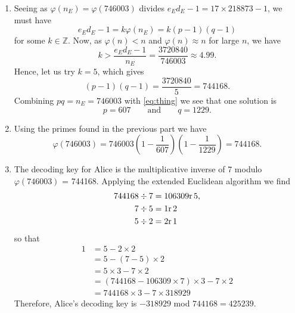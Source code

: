 \documentclass[a4paper]{article}
\begin{document}
\begin{enumerate}
\begin{enumerate}
			\item Seeing as $\varphi(n_E) = \varphi(746003)$ divides $e_E d_E - 1 = 17 \times 218873 - 1$, we must have
			\begin{equation*}
				e_E d_E - 1 = k \varphi(n_E) = k (p - 1) (q - 1)
			\end{equation*}
			for some $k \in \mathbb{Z}$. Now, as $\varphi(n) < n$ and $\varphi(n) \approx n$  for large $n$, we have
			\begin{equation*}
				k > \frac{e_E d_E - 1}{n_E} = \frac{3720840}{746003} \approx 4.99.
			\end{equation*}
			Hence, let us try $k = 5$, which gives
			\begin{equation}
				(p - 1) (q - 1) = \frac{3720840}{5} = 744168. \label{eq:thing}
			\end{equation}
			Combining $pq = n_E = 746003$ with \eqref{eq:thing} we see that one solution is
			\begin{equation*}
				p = 607 \qquad \text{and} \qquad q = 1229.
			\end{equation*}
			
			\item Using the primes found in the previous part we have
			\begin{equation*}
				\varphi(746003) = 746003 \left( 1 - \frac{1}{607} \right) \left( 1 - \frac{1}{1229} \right) = 744168.
			\end{equation*}
			
			\item The decoding key for Alice is the multiplicative inverse of 7 modulo $\varphi(746003)$ = 744168. Applying the extended Euclidean algorithm we find
			\begin{align*}
				744168 \div 7 &= 106309 \text r \, 5, \\
				7 \div 5 &= 1 \text r \, 2 \\
				5 \div 2 &= 2 \text r \, 1
			\end{align*}
			so that
			\begin{align*}
				1 &= 5 - 2 \times 2 \\
				  &= 5 - (7 - 5) \times 2  \\
				  &= 5 \times 3 - 7 \times 2 \\
				  &= (744168 - 106309 \times 7) \times 3 - 7 \times 2 \\
				  &= 744168 \times 3 - 7 \times 318929
			\end{align*}
			Therefore, Alice's decoding key is $- 318929$ mod $744168 = 425239$.
			

\end{enumerate}
\end{enumerate}
\end{document}
